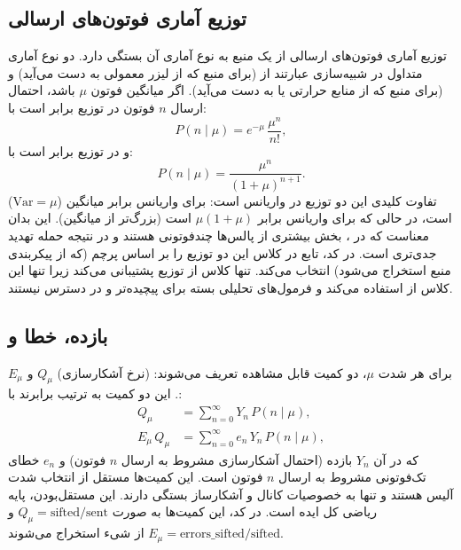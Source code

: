 \subsection{توزیع آماری فوتون‌های ارسالی}

توزیع آماری فوتون‌های ارسالی از یک منبع به نوع آماری آن بستگی دارد. دو نوع آماری متداول در شبیه‌سازی  عبارتند از  (برای منبع  که از لیزر معمولی به دست می‌آید) و  (برای منبع  که از منابع حرارتی یا  به دست می‌آید). اگر میانگین فوتون $\mu$ باشد، احتمال ارسال $n$ فوتون در توزیع  برابر است با:
\begin{equation}
	P(n \mid \mu) = e^{-\mu}\,\frac{\mu^n}{n!},
\end{equation}
و در توزیع  برابر است با:
\begin{equation}
	P(n \mid \mu) = \frac{\mu^n}{(1 + \mu)^{n+1}}.
\end{equation}
تفاوت کلیدی این دو توزیع در واریانس است: برای  واریانس برابر میانگین ($\text{Var} = \mu$) است، در حالی که برای  واریانس برابر $\mu(1 + \mu)$ است (بزرگ‌تر از میانگین). این بدان معناست که در ، بخش بیشتری از پالس‌ها چندفوتونی هستند و در نتیجه حمله  تهدید جدی‌تری است. در کد، تابع  در کلاس  این دو توزیع را بر اساس پرچم  (که از پیکربندی منبع استخراج می‌شود) انتخاب می‌کند. تنها کلاس  از توزیع  پشتیبانی می‌کند زیرا تنها این کلاس از  استفاده می‌کند و فرمول‌های تحلیلی بسته برای  پیچیده‌تر و در دسترس نیستند.

\subsection{بازده، خطا و }

برای هر شدت $\mu$، دو کمیت قابل مشاهده تعریف می‌شوند:  (نرخ آشکارسازی) $Q_\mu$ و  $E_\mu$. این دو کمیت به ترتیب برابرند با:
\begin{align}
	Q_\mu &= \sum_{n=0}^{\infty} Y_n\,P(n \mid \mu), \\
	E_\mu\,Q_\mu &= \sum_{n=0}^{\infty} e_n\,Y_n\,P(n \mid \mu),
\end{align}
که در آن $Y_n$ بازده (احتمال آشکارسازی مشروط به ارسال $n$ فوتون) و $e_n$ خطای تک‌فوتونی مشروط به ارسال $n$ فوتون است. این کمیت‌ها مستقل از انتخاب شدت آلیس هستند و تنها به خصوصیات کانال و آشکارساز بستگی دارند. این مستقل‌بودن، پایه ریاضی کل ایده  است. در کد، این کمیت‌ها به صورت $Q_\mu = \text{sifted}/\text{sent}$ و $E_\mu = \text{errors\_sifted}/\text{sifted}$ از شیء  استخراج می‌شوند.

